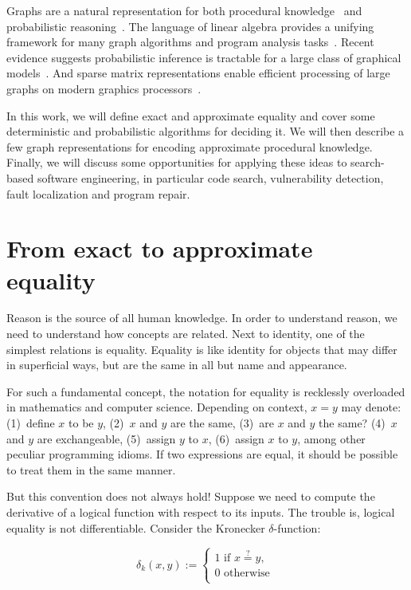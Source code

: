 \documentclass[11pt]{article}
\begin{document}
    Graphs are a natural representation for both procedural knowledge~\citep{allamanis2017learning} and probabilistic reasoning~\citep{pearl2014probabilistic}. The language of linear algebra provides a unifying framework for many graph algorithms and program analysis tasks~\citep{kepner2011graph}. Recent evidence suggests probabilistic inference is tractable for a large class of graphical models~\citep{choi2020probabilistic}. And sparse matrix representations enable efficient processing of large graphs on modern graphics processors~\citep{kepner2016mathematical}.

    In this work, we will define exact and approximate equality and cover some deterministic and probabilistic algorithms for deciding it. We will then describe a few graph representations for encoding approximate procedural knowledge. Finally, we will discuss some opportunities for applying these ideas to search-based software engineering, in particular code search, vulnerability detection, fault localization and program repair.


    \section{From exact to approximate equality}\label{sec:definitions}

    Reason is the source of all human knowledge. In order to understand reason, we need to understand how concepts are related. Next to identity, one of the simplest relations is equality. Equality is like identity for objects that may differ in superficial ways, but are the same in all but name and appearance.

    For such a fundamental concept, the notation for equality is recklessly overloaded in mathematics and computer science. Depending on context, $x = y$ may denote: (1)~define $x$ to be $y$, (2)~$x$ and $y$ are the same, (3)~are $x$ and $y$ the same? (4)~$x$ and $y$ are exchangeable, (5)~assign $y$ to $x$, (6)~assign $x$ to $y$, among other peculiar programming idioms. If two expressions are equal, it should be possible to treat them in the same manner.

    But this convention does not always hold! Suppose we need to compute the derivative of a logical function with respect to its inputs. The trouble is, logical equality is not differentiable. Consider the Kronecker $δ$-function: %

    $$
    δ_k(x, y) :=
    \begin{cases}
        1 \text{ if } x \overset{?}{=} y, \\
        0 \text{ otherwise }\\
    \end{cases}
    $$
\end{document}
